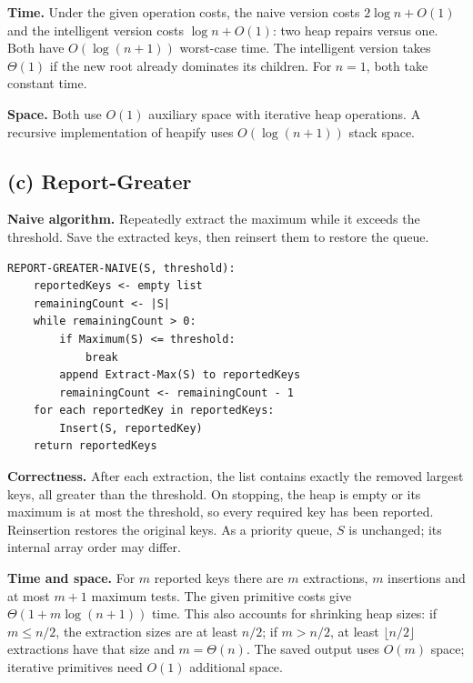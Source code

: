 \documentclass[11pt,a4paper]{article}
\newcommand{\parttitle}[1]{\Needspace{10\baselineskip}\subsection*{#1}}
\begin{document}
\textbf{Time.} Under the given operation costs, the naive version costs $2\log n+O(1)$ and the intelligent version costs $\log n+O(1)$: two heap repairs versus one. Both have $O(\log(n+1))$ worst-case time. The intelligent version takes $\Theta(1)$ if the new root already dominates its children. For $n=1$, both take constant time.

\textbf{Space.} Both use $O(1)$ auxiliary space with iterative heap operations. A recursive implementation of heapify uses $O(\log(n+1))$ stack space.

\parttitle{(c) Report-Greater}
\textbf{Naive algorithm.} Repeatedly extract the maximum while it exceeds the threshold. Save the extracted keys, then reinsert them to restore the queue.
\begin{lstlisting}
REPORT-GREATER-NAIVE(S, threshold):
    reportedKeys <- empty list
    remainingCount <- |S|
    while remainingCount > 0:
        if Maximum(S) <= threshold:
            break
        append Extract-Max(S) to reportedKeys
        remainingCount <- remainingCount - 1
    for each reportedKey in reportedKeys:
        Insert(S, reportedKey)
    return reportedKeys
\end{lstlisting}
\textbf{Correctness.} After each extraction, the list contains exactly the removed largest keys, all greater than the threshold. On stopping, the heap is empty or its maximum is at most the threshold, so every required key has been reported. Reinsertion restores the original keys. As a priority queue, $S$ is unchanged; its internal array order may differ.

\textbf{Time and space.} For $m$ reported keys there are $m$ extractions, $m$ insertions and at most $m+1$ maximum tests. The given primitive costs give $\boxed{\Theta(1+m\log(n+1))}$ time. This also accounts for shrinking heap sizes: if $m\le n/2$, the extraction sizes are at least $n/2$; if $m>n/2$, at least $\lfloor n/2\rfloor$ extractions have that size and $m=\Theta(n)$. The saved output uses $O(m)$ space; iterative primitives need $O(1)$ additional space.
\end{document}

